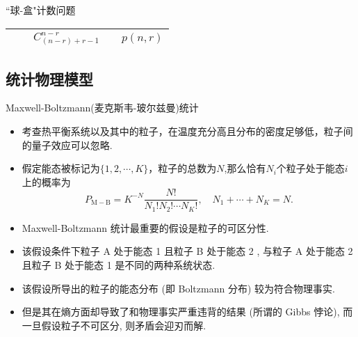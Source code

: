 \begin{frame}{``球-盒"计数问题}
\begin{table}[]
\begin{tabular}{|c|cc|cc|}
		\rowcolor[HTML]{ECF4FF}
		\cellcolor[HTML]{CBCEFB}{\color[HTML]{000000} 球不可区分}                                                                    & \multicolumn{1}{c|}{\cellcolor[HTML]{ECF4FF}{\color[HTML]{000000} $C_{n+r-1}^n$}}    & {\color[HTML]{000000} $C_{(n-r)+r-1}^{n-r}$}     & \multicolumn{1}{c|}{\cellcolor[HTML]{ECF4FF}{\color[HTML]{000000} $\sum_{k=1}^rp(n,r)$}}    & {\color[HTML]{000000} $p(n,r)$}     \\ \hline
		\end{tabular}
		\end{table}
\end{frame}
\subsection{统计物理模型}
\begin{frame}{{\rm Maxwell-Boltzmann}(麦克斯韦-玻尔兹曼)统计}
\begin{itemize}[<+-|alert@+>]
	\item 考查热平衡系统以及其中的粒子，在温度充分高且分布的密度足够低，粒子间的量子效应可以忽略.
	\item 假定能态被标记为${\{1,2,\cdots,K\}}$，粒子的总数为${N}$,那么恰有${N_{i}}$个粒子处于能态${i}$上的概率为
	\[P_{\mathrm{M}-\mathrm{B}}=K^{-N}\frac{N!}{N_{1}!N_{2}!\cdots N_{K}!},\quad N_1+\cdots+N_K=N.\]
	\item Maxwell-Boltzmann 统计最重要的假设是粒子的可区分性.
	\item 该假设条件下粒子 A 处于能态 1 且粒子 B 处于能态 2 , 与粒子 A 处于能态 2 且粒子 B 处于能态 1 是不同的两种系统状态.
	\item 该假设所导出的粒子的能态分布 (即 Boltzmann 分布) 较为符合物理事实.
	\item 但是其在熵方面却导致了和物理事实严重违背的结果 (所谓的 Gibbs 悖论), 而一旦假设粒子不可区分, 则矛盾会迎刃而解.
\end{itemize}



\end{frame}


